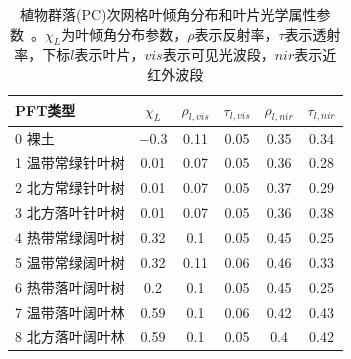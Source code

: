 \begin{table}[htbp]
	\centering
	\caption[植物群落(PC)次网格叶倾角分布和叶片光学属性参数]{植物群落(PC)次网格叶倾角分布和叶片光学属性参数~\citep{majasalmi2019evaluation,dong2021effects}。$\chi_L$为叶倾角分布参数，$\rho$表示反射率，$\tau$表示透射率，下标$l$表示叶片，$vis$表示可见光波段，$nir$表示近红外波段}
	\label{tab:PC叶倾角分布和叶片光学属性参数}
    \begin{tabular}{@{}lccccc@{}}
    \toprule
    PFT类型       & $\chi_L$ & $\rho_{l,vis}$ & $\tau_{l,vis}$ & $\rho_{l,nir}$ & $\tau_{l,nir}$ \\ \midrule
    0 裸土        & \num {-0.3 }                  & 0.11                           & 0.05                           & 0.35                           & 0.34                            \\
    1 温带常绿针叶树   & 0.01                   & 0.07                           & 0.05                           & 0.36                           & 0.28                            \\
    2 北方常绿针叶树   & 0.01                   & 0.07                           & 0.05                           & 0.37                           & 0.29                            \\
    3 北方落叶针叶树   & 0.01                   & 0.07                           & 0.05                           & 0.36                           & 0.38                            \\
    4 热带常绿阔叶树   & 0.32                   & 0.1                            & 0.05                           & 0.45                           & 0.25                            \\
    5 温带常绿阔叶树   & 0.32                   & 0.11                           & 0.06                           & 0.46                           & 0.33                            \\
    6 热带落叶阔叶树   & 0.2                    & 0.1                            & 0.05                           & 0.45                           & 0.25                            \\
    7 温带落叶阔叶林   & 0.59                   & 0.1                            & 0.06                           & 0.42                           & 0.43                            \\
    8 北方落叶阔叶林   & 0.59                   & 0.1                            & 0.05                           & 0.4                            & 0.42                            \\

\end{tabular}
\end{table}
